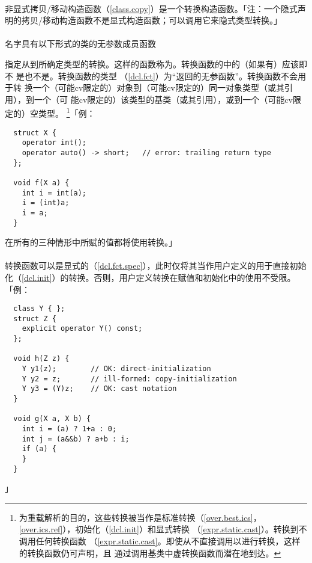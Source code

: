 \paragraph{}
非显式拷贝/移动构造函数（\ref{class.copy}）是一个转换构造函数。「注：一个隐式声
明的拷贝/移动构造函数不是显式构造函数；可以调用它来隐式类型转换。」

\paragraph{}
名字具有以下形式的类的无参数成员函数


指定从到所确定类型的转换。这样的函数称为。转换函数的中的（如果有）应该即不
是也不是。转换函数的类型
（\ref{dcl.fct}）为``返回的无参函数''。转换函数不会用于转
换一个（可能cv限定的）对象到（可能cv限定的）同一对象类型（或其引用），到一个（可
能cv限定的）该类型的基类（或其引用），或到一个（可能cv限定的）空类型。
\footnote{为重载解析的目的，这些转换被当作是标准转换（\ref{over.best.ics}，
\ref{over.ics.ref}），初始化（\ref{dcl.init}）和显式转换
（\ref{expr.static.cast}）。转换到不调用任何转换函数
（\ref{expr.static.cast}。即使从不直接调用以进行转换，这样的转换函数仍可声明，且
通过调用基类中虚转换函数而潜在地到达。}「例：
\begin{lstlisting}
  struct X {
    operator int();
    operator auto() -> short;   // error: trailing return type
  };

  void f(X a) {
    int i = int(a);
    i = (int)a;
    i = a;
  }
\end{lstlisting}
在所有的三种情形中所赋的值都将使用转换。」

\paragraph{}
转换函数可以是显式的（\ref{dcl.fct.spec}），此时仅将其当作用户定义的用于直接初始
化（\ref{dcl.init}）的转换。否则，用户定义转换在赋值和初始化中的使用不受限。
「例：
\begin{lstlisting}
  class Y { };
  struct Z {
    explicit operator Y() const;
  };

  void h(Z z) {
    Y y1(z);        // OK: direct-initialization
    Y y2 = z;       // ill-formed: copy-initialization
    Y y3 = (Y)z;    // OK: cast notation
  }

  void g(X a, X b) {
    int i = (a) ? 1+a : 0;
    int j = (a&&b) ? a+b : i;
    if (a) {
    }
  }
\end{lstlisting}」

